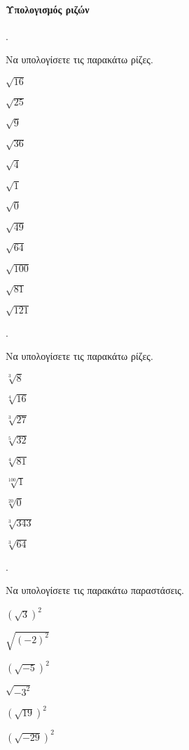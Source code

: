 \documentclass[11pt,a4paper,twocolumn]{article}
\newcounter{askhsh}
\newcommand{\askhsh}{\large\theaskhsh.\ \addtocounter{askhsh}{1}}
\begin{document}
\paragraph{Υπολογισμός ριζών}
\askhsh Να υπολογίσετε τις παρακάτω ρίζες.
\begin{multicols}{3}
\begin{alist}
\item $\sqrt{16}$
\item $\sqrt{25}$
\item $\sqrt{9}$
\item $\sqrt{36}$
\item $\sqrt{4}$
\item $\sqrt{1}$
\item $\sqrt{0}$
\item $\sqrt{49}$
\item $\sqrt{64}$
\item $\sqrt{100}$
\item $\sqrt{81}$
\item $\sqrt{121}$
\end{alist}
\end{multicols}
\askhsh Να υπολογίσετε τις παρακάτω ρίζες.
\begin{multicols}{3}
\begin{alist}
\item $\sqrt[3]{8}$
\item $\sqrt[4]{16}$
\item $\sqrt[3]{27}$
\item $\sqrt[5]{32}$
\item $\sqrt[4]{81}$
\item $\sqrt[100]{1}$
\item $\sqrt[20]{0}$
\item $\sqrt[3]{343}$
\item $\sqrt[3]{64}$
\end{alist}
\end{multicols}
\askhsh Να υπολογίσετε τις παρακάτω παραστάσεις.
\begin{multicols}{3}
\begin{alist}
\item $\left(\sqrt{3}\right)^2$
\item $\sqrt{(-2)^2}$
\item $\left(\sqrt{-5}\right)^2$
\item $\sqrt{-3^2}$
\item $\left(\sqrt{19}\right)^2$
\item $\left(\sqrt{-29}\right)^2$
\end{alist}
\end{multicols}
\end{document}

